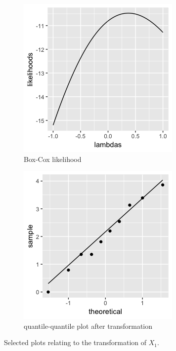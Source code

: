 \begin{enumerate}
\begin{figure}[H]
\begin{subfigure}{.33\textwidth}
	\includegraphics[width=.8\linewidth]{plot_4_30_a_bxcx.png}
  \caption{Box-Cox likelihood}
  \label{fig:sfig2}
\end{subfigure}
\begin{subfigure}{.33\textwidth}
  \centering
	\includegraphics[width=.8\linewidth]{plot_4_30_a_qqnew.png}
  \caption{quantile-quantile plot after transformation}
  \label{fig:sfig2}
\end{subfigure}
\caption{Selected plots relating to the transformation of $X_1$.}
\end{figure}


\end{enumerate}
